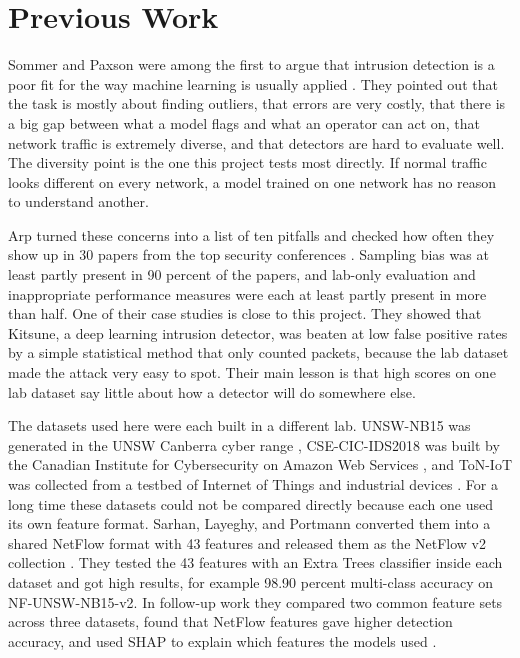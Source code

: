 \section{Previous Work}
\label{sec:previous}

Sommer and Paxson were among the first to argue that intrusion detection is a poor fit for the way machine learning is usually applied \cite{sommer2010}. They pointed out that the task is mostly about finding outliers, that errors are very costly, that there is a big gap between what a model flags and what an operator can act on, that network traffic is extremely diverse, and that detectors are hard to evaluate well. The diversity point is the one this project tests most directly. If normal traffic looks different on every network, a model trained on one network has no reason to understand another.

Arp \etal turned these concerns into a list of ten pitfalls and checked how often they show up in 30 papers from the top security conferences \cite{arp2022}. Sampling bias was at least partly present in 90 percent of the papers, and lab-only evaluation and inappropriate performance measures were each at least partly present in more than half. One of their case studies is close to this project. They showed that Kitsune, a deep learning intrusion detector, was beaten at low false positive rates by a simple statistical method that only counted packets, because the lab dataset made the attack very easy to spot. Their main lesson is that high scores on one lab dataset say little about how a detector will do somewhere else.

The datasets used here were each built in a different lab. UNSW-NB15 was generated in the UNSW Canberra cyber range \cite{moustafa2015}, CSE-CIC-IDS2018 was built by the Canadian Institute for Cybersecurity on Amazon Web Services \cite{sharafaldin2018}, and ToN-IoT was collected from a testbed of Internet of Things and industrial devices \cite{moustafa2021}. For a long time these datasets could not be compared directly because each one used its own feature format. Sarhan, Layeghy, and Portmann converted them into a shared NetFlow format with 43 features and released them as the NetFlow v2 collection \cite{sarhan2022}. They tested the 43 features with an Extra Trees classifier inside each dataset and got high results, for example 98.90 percent multi-class accuracy on NF-UNSW-NB15-v2. In follow-up work they compared two common feature sets across three datasets, found that NetFlow features gave higher detection accuracy, and used SHAP to explain which features the models used \cite{sarhan2022bdr}.

